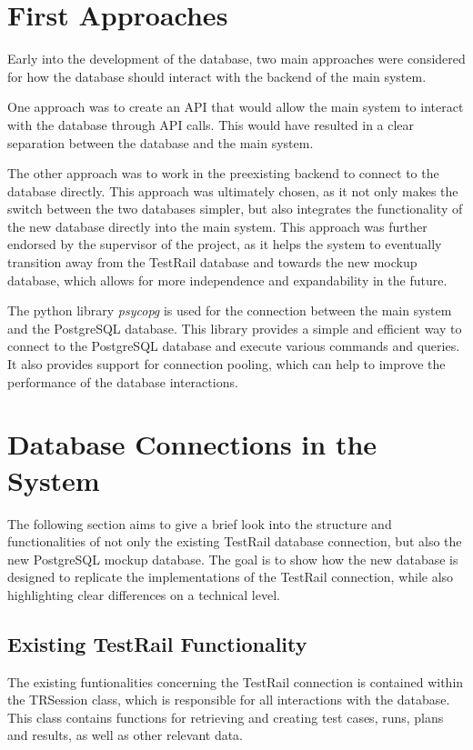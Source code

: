 \section{First Approaches}

Early into the development of the database, two main approaches were considered for how the database should interact with the backend of the main system. 

One approach was to create an API that would allow the main system to interact with the database through API calls. This would have resulted in a clear separation between the database and the main system.

The other approach was to work in the preexisting backend to connect to the database directly. This approach was ultimately chosen, as it not only makes the switch between the two databases simpler, but also integrates the functionality of the new database directly into the main system. This approach was further endorsed by the supervisor of the project, as it helps the system to eventually transition away from the TestRail database and towards the new mockup database, which allows for more independence and expandability in the future.

The python library \textit{psycopg} is used for the connection between the main system and the PostgreSQL database. This library provides a simple and efficient way to connect to the PostgreSQL database and execute various commands and queries. It also provides support for connection pooling, which can help to improve the performance of the database interactions.

\section{Database Connections in the System}

The following section aims to give a brief look into the structure and functionalities of not only the existing TestRail database connection, but also the new PostgreSQL mockup database. The goal is to show how the new database is designed to replicate the implementations of the TestRail connection, while also highlighting clear differences on a technical level.

\subsection{Existing TestRail Functionality}

The existing funtionalities concerning the TestRail connection is contained within the TRSession class, which is responsible for all interactions with the database. This class contains functions for retrieving and creating test cases, runs, plans and results, as well as other relevant data. 


